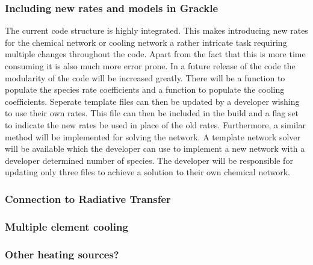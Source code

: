 \subsubsection{Including new rates and models in Grackle}
\jr{} The current code structure is highly integrated. This makes introducing new rates for the 
chemical network or cooling network a rather intricate task requiring multiple changes throughout the code. 
Apart from the fact that this is more time consuming it is also much more error prone. In a future release of the 
code the modularity of the code will be increased greatly. There will be a function to populate the species 
rate coefficients and a function to populate the cooling coefficients. Seperate template files can then be 
updated by a developer wishing to use their own rates. This file can then be included in the build and a flag
set to indicate the new rates be used in place of the old rates. Furthermore, a similar method will be 
implemented for solving the network. A template network solver will be available which the developer can use to 
implement a new network with a developer determined number of species. The developer will be responsible for
updating only three files to achieve a solution to their own chemical network. 

\subsubsection{Connection to Radiative Transfer}

\subsubsection{Multiple element cooling}

\subsubsection{Other heating sources?}
